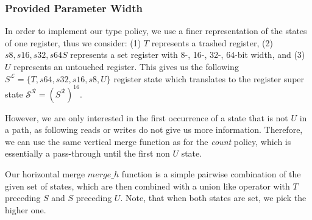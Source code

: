 \subsubsection{Provided Parameter Width}
\label{subsection:providedparamwideness}
In order to implement our {type} policy, we use a finer representation of the states of one register, thus we consider:
(1) $T$ represents a trashed register,
(2) $s8, s16, s32, s64 S$ represents a set register with  8-, 16-, 32-, 64-bit width, and
(3) $U$ represents an untouched register.
This gives us the following $S^\mathcal{L} = \{ T, s64, s32, s16, s8, U \}$ register state which translates to the register 
super state $\mathcal{S}^\mathcal{R} = (S^\mathcal{R})^{16}$.

However, we are only interested in the first occurrence of a state that is not $U$ in a path, as following reads or writes do not give us more information. Therefore, we can use 
the same vertical merge function as for the \emph{count} policy, which is essentially a pass-through until the first non $U$ state.

Our horizontal merge $merge\_h$ function is a simple pairwise combination of the given set of states, which are then combined with a union like operator with $T$ 
preceding $S$ and $S$ preceding $U$. Note, that when both states are set, we pick the higher one.

